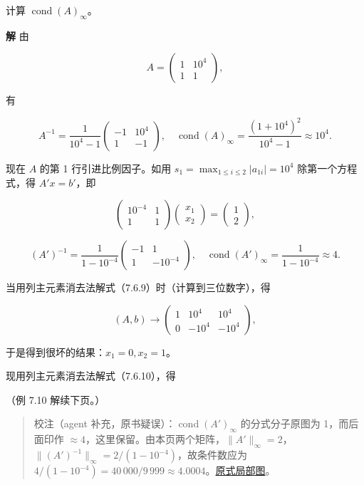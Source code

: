 计算 \(\operatorname{cond}(A)_\infty\)。

\textbf{解} 由

\[
A=\begin{pmatrix}1&10^4\\1&1\end{pmatrix},
\]

有

\[
A^{-1}=\frac1{10^4-1}\begin{pmatrix}-1&10^4\\1&-1\end{pmatrix},\quad
\operatorname{cond}(A)_\infty=\frac{(1+10^4)^2}{10^4-1}\approx10^4.
\]

现在 \(A\) 的第 1 行引进比例因子。如用 \(s_1=\max_{1\leqslant i\leqslant2}|a_{1i}|=10^4\) 除第一个方程式，得 \(A'x=b'\)，即

\[
\begin{pmatrix}10^{-4}&1\\1&1\end{pmatrix}
\begin{pmatrix}x_1\\x_2\end{pmatrix}
=\begin{pmatrix}1\\2\end{pmatrix},
\tag{7.6.10}
\]

\[
(A')^{-1}=\frac1{1-10^{-4}}\begin{pmatrix}-1&1\\1&-10^{-4}\end{pmatrix},\quad
\operatorname{cond}(A')_\infty=\frac1{1-10^{-4}}\approx4.
\]

当用列主元素消去法解式（7.6.9）时（计算到三位数字），得

\[
(A,b)\longrightarrow
\left(\begin{array}{cc|c}
1&10^4&10^4\\
0&-10^4&-10^4
\end{array}\right),
\]

于是得到很坏的结果：\(x_1=0,x_2=1\)。

现用列主元素消去法解式（7.6.10），得

（例 7.10 解续下页。）

\begin{quote}
校注（agent 补充，原书疑误）：\(\operatorname{cond}(A')_\infty\) 的分式分子原图为 1，而后面印作 \(\approx4\)，这里保留。由本页两个矩阵，\(\|A'\|_\infty=2\)，\(\|(A')^{-1}\|_\infty=2/(1-10^{-4})\)，故条件数应为 \(4/(1-10^{-4})=40\,000/9\,999\approx4.0004\)。\href{verified/assets/ch07b/209-scaled-cond.png}{原式局部图}。
\end{quote}

